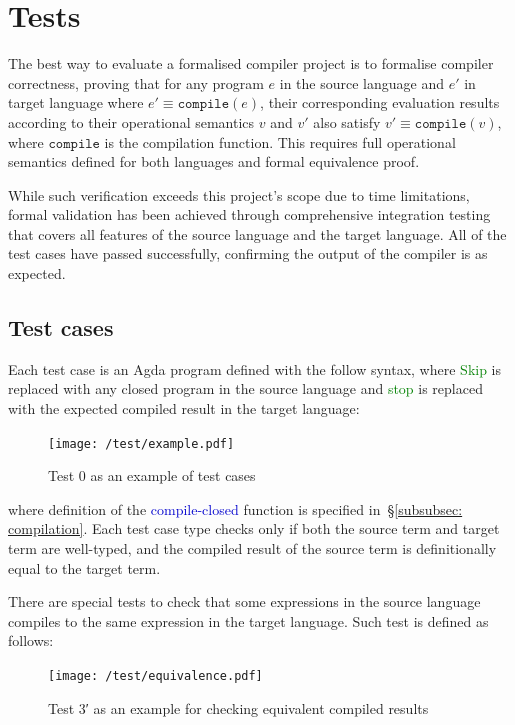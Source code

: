 \documentclass[12pt,a4paper]{report}
\theoremstyle{definition}
\newcommand{\secref}[1]{\S\ref{#1}}
\newcommand{\mb}[1]{\textcolor{mediumblue}{#1}}
\newcommand{\gn}[1]{\textcolor{green}{#1}}
\begin{document}
    \section{Tests}
    The best way to evaluate a formalised compiler project is to formalise compiler correctness, proving that for any program $e$ in the source language and $e'$ in target language where $e' \equiv \texttt{compile}(e)$, their corresponding evaluation results according to their operational semantics $v$ and $v'$ also satisfy $v' \equiv \texttt{compile}(v)$, where $\texttt{compile}$ is the compilation function. This requires full operational semantics defined for both languages and formal equivalence proof.  
    
    While such verification exceeds this project's scope due to time limitations, formal validation has been achieved through comprehensive integration testing that covers all features of the source language and the target language. All of the test cases have passed successfully, confirming the output of the compiler is as expected.

    \subsection{Test cases}
    Each test case is an Agda program defined with the follow syntax, where \gn{\textsf{Skip}} is replaced with any closed program in the source language and \gn{\textsf{stop}} is replaced with the expected compiled result in the target language:
    \begin{figure}[H]
        \centering
        \texttt{[image: /test/example.pdf]}
        \caption{Test 0 as an example of test cases}
        \label{fig: test_case_0}
    \end{figure}
    where definition of the \mb{\textsf{compile-closed}} function is specified in~\secref{subsubsec: compilation}. Each test case type checks only if both the source term and target term are well-typed, and the compiled result of the source term is definitionally equal to the target term.

    There are special tests to check that some expressions in the source language compiles to the same expression in the target language. Such test is defined as follows:
    \begin{figure}[H]
        \centering
        \texttt{[image: /test/equivalence.pdf]}
        \caption{Test 3′ as an example for checking equivalent compiled results}
        \label{fig: test_case_3′}
    \end{figure}
\end{document}
